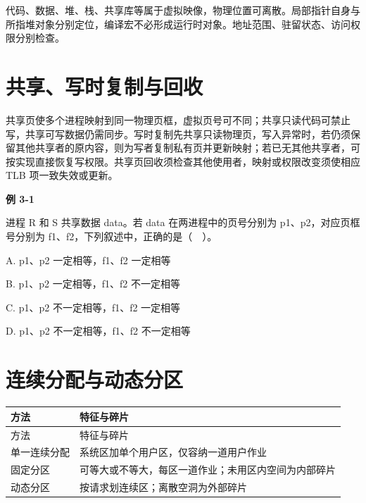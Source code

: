 代码、数据、堆、栈、共享库等属于虚拟映像，物理位置可离散。局部指针自身与所指堆对象分别定位，编译宏不必形成运行时对象。地址范围、驻留状态、访问权限分别检查。

\section{共享、写时复制与回收}\label{OS03-sharing}

共享页使多个进程映射到同一物理页框，虚拟页号可不同；共享只读代码可禁止写，共享可写数据仍需同步。写时复制先共享只读物理页，写入异常时，若仍须保留其他共享者的原内容，则为写者复制私有页并更新映射；若已无其他共享者，可按实现直接恢复写权限。共享页回收须检查其他使用者，映射或权限改变须使相应 TLB 项一致失效或更新。

\par\medskip{}\noindent\hypertarget{OS03-E01}{}\label{OS03-E01}\textbf{例 3-1}\par\nobreak\smallskip

进程 R 和 S 共享数据 data。若 data 在两进程中的页号分别为 p1、p2，对应页框号分别为 f1、f2，下列叙述中，正确的是（　）。

A. p1、p2 一定相等，f1、f2 一定相等

B. p1、p2 一定相等，f1、f2 不一定相等

C. p1、p2 不一定相等，f1、f2 一定相等

D. p1、p2 不一定相等，f1、f2 不一定相等


\section{连续分配与动态分区}\label{OS03-partitions}

\par\smallskip
{\fontsize{9.3}{12}\selectfont\setlength{\tabcolsep}{2.5pt}\setlength{\LTleft}{0pt}\setlength{\LTright}{0pt}
\begin{longtable}{@{}>{\raggedright\arraybackslash}p{}>{\raggedright\arraybackslash}p{}@{}}
\toprule
方法 & 特征与碎片 \\

\midrule\endfirsthead\toprule
方法 & 特征与碎片 \\

\midrule\endhead\bottomrule\endfoot
单一连续分配 & 系统区加单个用户区，仅容纳一道用户作业 \\

固定分区 & 可等大或不等大，每区一道作业；未用区内空间为内部碎片 \\

动态分区 & 按请求划连续区；离散空洞为外部碎片 \\

\end{longtable}}
\par\smallskip


